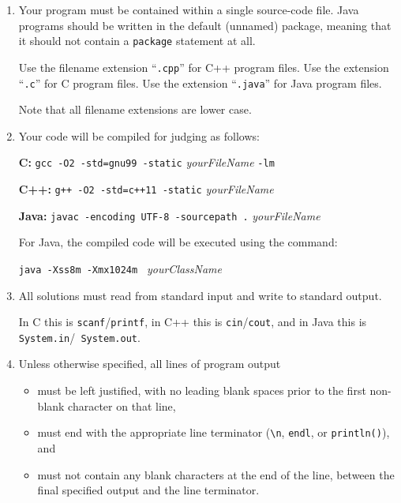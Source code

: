 \begin{enumerate}
\setcounter{enumi}{\value{savedEnumi}}

\item Your program must be contained within a single source-code
  file. Java programs should be written in the default (unnamed)
  package, meaning that it should not contain a \texttt{package}
  statement at all.

  Use the filename extension ``{\tt .cpp}'' for C++ program files.
  Use the extension ``{\tt .c}'' for C program files. 
  Use the extension ``{\tt .java}'' for Java program files. 

  Note that all filename extensions are lower case.

\item Your code will be compiled for judging as follows:

    \textbf{C:} \texttt{gcc -O2 -std=gnu99 -static} \textit{yourFileName} \texttt{-lm}

    \textbf{C++:} \texttt{g++ -O2 -std=c++11 -static} \textit{yourFileName}

    \textbf{Java:} \texttt{javac -encoding UTF-8 -sourcepath .} \textit{yourFileName}
    

    For Java, the compiled code will be executed using the command:
    
    \texttt{java -Xss8m -Xmx1024m } \textit{yourClassName}

    

\item All solutions must read from standard input and write to
  standard output.  

  In C this is {\tt scanf}/{\tt printf}, in C++ this
  is {\tt cin}/{\tt cout}, and in Java this is {\tt System.in}/{\tt
  System.out}.  

\item Unless otherwise specified, all lines of program output 
    \begin{itemize}

        \item must be left justified, with no leading blank spaces
          prior to the first non-blank character on that line,

        \item must end with the appropriate line terminator
          (\verb#\n#, \verb#endl#, or \verb#println()#), and

        \item must not contain any blank characters at the end of the
        line, between the final specified output and the line
        terminator.


\end{itemize}
\end{enumerate}
